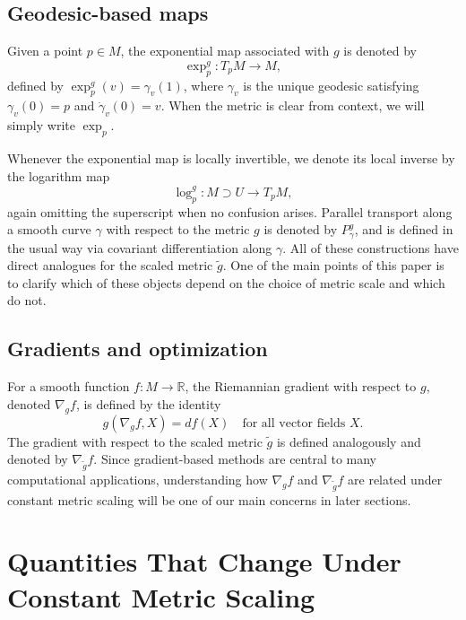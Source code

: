 \documentclass[11pt]{article}
\begin{document}
\subsection{Geodesic-based maps}

Given a point $p \in M$, the exponential map associated with $g$ is denoted by
\begin{equation*}
    \exp_p^g : T_p M \to M,
\end{equation*}
defined by $\exp_p^g(v) = \gamma_v(1)$, where $\gamma_v$ is the unique geodesic satisfying $\gamma_v(0) = p$ and $\dot\gamma_v(0) = v$. When the metric is clear from context, we will simply write $\exp_p$.

Whenever the exponential map is locally invertible, we denote its local inverse by the logarithm map
\begin{equation*}
    \log_p^g : M \supset U \to T_p M,
\end{equation*}
again omitting the superscript when no confusion arises. Parallel transport along a smooth curve $\gamma$ with respect to the metric $g$ is denoted by $P_\gamma^g$, and is defined in the usual way via covariant differentiation along $\gamma$. All of these constructions have direct analogues for the scaled metric $\tilde g$. One of the main points of this paper is to clarify which of these objects depend on the choice of metric scale and which do not.

\subsection{Gradients and optimization}

For a smooth function $f : M \to \mathbb{R}$, the Riemannian gradient with respect to $g$, denoted $\nabla_g f$, is defined by the identity
\begin{equation*}
g(\nabla_g f, X) = df(X)
\quad \text{for all vector fields } X.
\end{equation*}
The gradient with respect to the scaled metric $\tilde g$ is defined analogously and denoted by $\nabla_{\tilde g} f$. Since gradient-based methods are central to many computational applications, understanding how $\nabla_g f$ and $\nabla_{\tilde g} f$ are related under constant metric scaling will be one of our main concerns in later sections.



\section{Quantities That Change Under Constant Metric Scaling}
\end{document}
